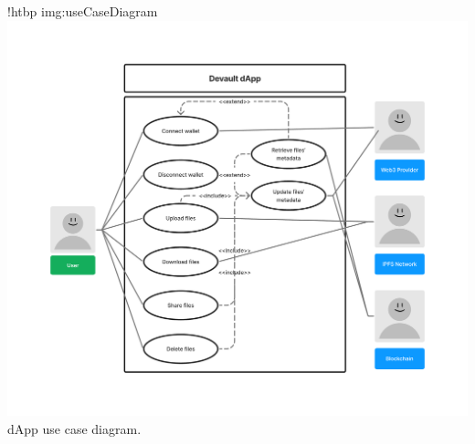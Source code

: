 \namedfigure
{!htbp}
{img:useCaseDiagram}
{\includegraphics[width=\textwidth]{resources/images/usecases-diagram.pdf}}
{dApp use case diagram.}
